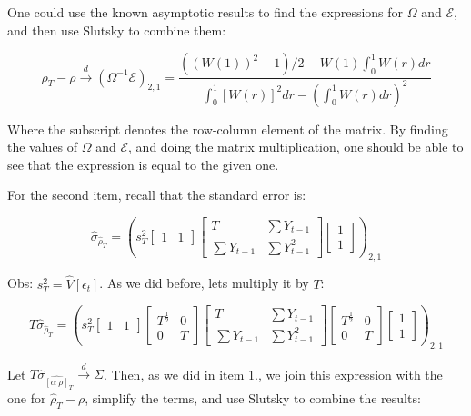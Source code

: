 \documentclass[12pt]{article}
\begin{document}
One could use the known asymptotic results to find the expressions for $\Omega$ and $\mathcal{E}$, and then use Slutsky to combine them:

$$
\hat{\rho}_T - \rho \xrightarrow{d} \left(\Omega^{-1}\mathcal{E}\right)_{2,1} = \frac{((W(1))^2 - 1)/2 - W(1)\int^1_0W(r) dr}{\int^1_0 [W(r)]^2 dr - (\int^1_0 W(r) dr)^2}
$$

Where the subscript denotes the row-column element of the matrix. By finding the values of $\Omega$ and $\mathcal{E}$, and doing the matrix multiplication, one should be able to see that the expression is equal to the given one.

For the second item, recall that the standard error is:

$$
\hat{\sigma}_{\hat{\rho}_T} = \left(s^2_T
\begin{bmatrix}
    1 & 1
\end{bmatrix}
\begin{bmatrix}
    T & \sum Y_{t-1}\\ \sum Y_{t-1} & \sum Y^2_{t-1}
\end{bmatrix}
\begin{bmatrix}
    1 \\ 1
\end{bmatrix}\right)_{2,1}
$$

Obs: $s^2_T = \hat{V}[\epsilon_t]$. As we did before, lets multiply it by $T$:

$$
T \hat{\sigma}_{\hat{\rho}_T} = \left(s^2_T
\begin{bmatrix}
    1 & 1
\end{bmatrix}
\begin{bmatrix}
    T^\frac{1}{2} & 0 \\ 0 & T
\end{bmatrix}
\begin{bmatrix}
    T & \sum Y_{t-1}\\ \sum Y_{t-1} & \sum Y^2_{t-1}
\end{bmatrix}
\begin{bmatrix}
    T^\frac{1}{2} & 0 \\ 0 & T
\end{bmatrix}
\begin{bmatrix}
    1 \\ 1
\end{bmatrix}\right)_{2,1}
$$

Let $T \hat{\sigma}_{\hat{[\alpha ~ \rho]}_T} \xrightarrow{d} \Sigma$. Then, as we did in item 1., we join this expression with the one for $\hat{\rho}_T - \rho$, simplify the terms, and use Slutsky to combine the results:
\end{document}
